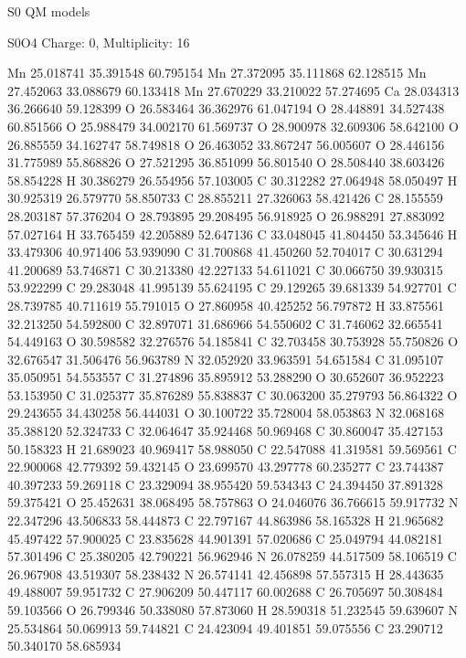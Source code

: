 \documentclass{article}
\begin{document}
S0 QM models   
    
S0O4   Charge: 0, Multiplicity: 16     
    
Mn 25.018741 35.391548 60.795154 
Mn 27.372095 35.111868 62.128515 
Mn 27.452063 33.088679 60.133418 
Mn 27.670229 33.210022 57.274695 
Ca 28.034313 36.266640 59.128399 
O 26.583464 36.362976 61.047194 
O 28.448891 34.527438 60.851566 
O 25.988479 34.002170 61.569737 
O 28.900978 32.609306 58.642100 
O 26.885559 34.162747 58.749818 
O 26.463052 33.867247 56.005607 
O 28.446156 31.775989 55.868826 
O 27.521295 36.851099 56.801540 
O 28.508440 38.603426 58.854228 
H 30.386279 26.554956 57.103005 
C 30.312282 27.064948 58.050497 
H 30.925319 26.579770 58.850733 
C 28.855211 27.326063 58.421426 
C 28.155559 28.203187 57.376204 
O 28.793895 29.208495 56.918925 
O 26.988291 27.883092 57.027164 
H 33.765459 42.205889 52.647136 
C 33.048045 41.804450 53.345646 
H 33.479306 40.971406 53.939090 
C 31.700868 41.450260 52.704017 
C 30.631294 41.200689 53.746871 
C 30.213380 42.227133 54.611021 
C 30.066750 39.930315 53.922299 
C 29.283048 41.995139 55.624195 
C 29.129265 39.681339 54.927701 
C 28.739785 40.711619 55.791015 
O 27.860958 40.425252 56.797872 
H 33.875561 32.213250 54.592800 
C 32.897071 31.686966 54.550602 
C 31.746062 32.665541 54.449163 
O 30.598582 32.276576 54.185841 
C 32.703458 30.753928 55.750826 
O 32.676547 31.506476 56.963789 
N 32.052920 33.963591 54.651584 
C 31.095107 35.050951 54.553557 
C 31.274896 35.895912 53.288290 
O 30.652607 36.952223 53.153950 
C 31.025377 35.876289 55.838837 
C 30.063200 35.279793 56.864322 
O 29.243655 34.430258 56.444031 
O 30.100722 35.728004 58.053863 
N 32.068168 35.388120 52.324733 
C 32.064647 35.924468 50.969468 
C 30.860047 35.427153 50.158323 
H 21.689023 40.969417 58.988050 
C 22.547088 41.319581 59.569561 
C 22.900068 42.779392 59.432145 
O 23.699570 43.297778 60.235277 
C 23.744387 40.397233 59.269118 
C 23.329094 38.955420 59.534343 
C 24.394450 37.891328 59.375421 
O 25.452631 38.068495 58.757863 
O 24.046076 36.766615 59.917732 
N 22.347296 43.506833 58.444873 
C 22.797167 44.863986 58.165328 
H 21.965682 45.497422 57.900025 
C 23.835628 44.901391 57.020686 
C 25.049794 44.082181 57.301496 
C 25.380205 42.790221 56.962946 
N 26.078259 44.517509 58.106519 
C 26.967908 43.519307 58.238432 
N 26.574141 42.456898 57.557315 
H 28.443635 49.488007 59.951732 
C 27.906209 50.447117 60.002688 
C 26.705697 50.308484 59.103566 
O 26.799346 50.338080 57.873060 
H 28.590318 51.232545 59.639607 
N 25.534864 50.069913 59.744821 
C 24.423094 49.401851 59.075556 
C 23.290712 50.340170 58.685934 
\end{document}

